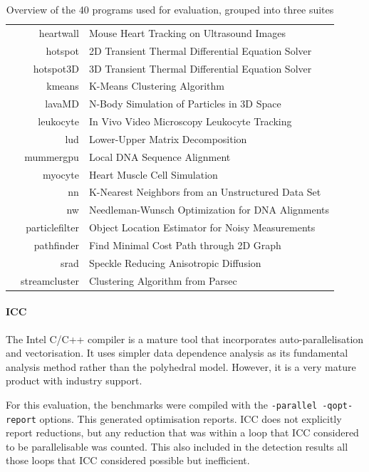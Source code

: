 \begin{table}[H]
\begin{tabular}{lrl}
 & heartwall      & Mouse Heart Tracking on Ultrasound Images\\[-2.3mm]
 & hotspot        & 2D Transient Thermal Differential Equation Solver\\[-2.3mm]
 & hotspot3D      & 3D Transient Thermal Differential Equation Solver\\[-2.3mm]
 & kmeans         & K-Means Clustering Algorithm\\[-2.3mm]
 & lavaMD         & N-Body Simulation of Particles in 3D Space\\[-2.3mm]
 & leukocyte      & In Vivo Video Microscopy Leukocyte Tracking\\[-2.3mm]
 & lud            & Lower-Upper Matrix Decomposition\\[-2.3mm]
 & mummergpu      & Local DNA Sequence Alignment\\[-2.3mm]
 & myocyte        & Heart Muscle Cell Simulation\\[-2.3mm]
 & nn             & K-Nearest Neighbors from an Unstructured Data Set \\[-2.3mm]
 & nw             & Needleman-Wunsch Optimization for DNA Alignments\\[-2.3mm]
 & particlefilter & Object Location Estimator for Noisy Measurements\\[-2.3mm]
 & pathfinder     & Find Minimal Cost Path through 2D Graph\\[-2.3mm]
 & srad           & Speckle Reducing Anisotropic Diffusion\\[-2.3mm]
 & streamcluster  & Clustering Algorithm from Parsec\\
\bottomrule
\end{tabular}
\caption{Overview of the 40 programs used for evaluation, grouped into three
         suites}
\label{allbenchmarklist}
\end{table}

\paragraph*{ICC}

    The Intel C/C++ compiler is a mature tool that incorporates
    auto-parallelisation and vectorisation.
    It uses simpler data dependence analysis as its fundamental analysis method
    rather than the polyhedral model.
    However, it is a very mature product with industry support.

    For this evaluation, the benchmarks were compiled with the
    \texttt{-parallel -qopt-report} options.
    This generated optimisation reports.
    ICC does not explicitly report reductions, but any reduction that was
    within a loop that ICC considered to be parallelisable was counted.
    This also included in the detection results all those loops that ICC
    considered possible but inefficient.

